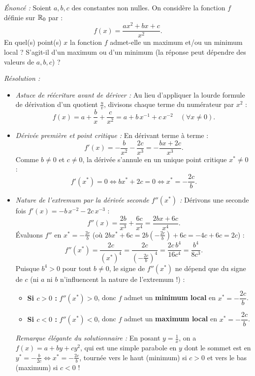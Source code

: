 \begin{exemple}
\emph{Énoncé :} Soient $a, b, c$ des constantes non nulles. On considère la fonction $f$ définie sur $\mathbb{R}_0$ par :
\[
    f(x) = \frac{ax^2 + bx + c}{x^2}.
\]
En quel(s) point(s) $x$ la fonction $f$ admet-elle un maximum et/ou un minimum local ? S'agit-il d'un maximum ou d'un minimum (la réponse peut dépendre des valeurs de $a, b, c$) ?

\emph{Résolution :}
\begin{itemize}
    \item \emph{Astuce de réécriture avant de dériver :} Au lieu d'appliquer la lourde formule de dérivation d'un quotient $\frac{u}{v}$, divisons chaque terme du numérateur par $x^2$ :
    \[
        f(x) = a + \frac{b}{x} + \frac{c}{x^2} = a + b\,x^{-1} + c\,x^{-2} \quad (\forall x \neq 0).
    \]
    \item \emph{Dérivée première et point critique :} En dérivant terme à terme :
    \[
        f'(x) = -\frac{b}{x^2} - \frac{2c}{x^3} = -\frac{bx + 2c}{x^3}.
    \]
    Comme $b \neq 0$ et $c \neq 0$, la dérivée s'annule en un unique point critique $x^* \neq 0$ :
    \[
        f'(x^*) = 0 \iff bx^* + 2c = 0 \iff \boxed{x^* = -\frac{2c}{b}}.
    \]
    \item \emph{Nature de l'extremum par la dérivée seconde $f''(x^*)$ :} Dérivons une seconde fois $f'(x) = -b\,x^{-2} - 2c\,x^{-3}$ :
    \[
        f''(x) = \frac{2b}{x^3} + \frac{6c}{x^4} = \frac{2bx + 6c}{x^4}.
    \]
    Évaluons $f''$ en $x^* = -\frac{2c}{b}$ (où $2bx^* + 6c = 2b\left(-\frac{2c}{b}\right) + 6c = -4c + 6c = 2c$) :
    \[
        f''(x^*) = \frac{2c}{(x^*)^4} = \frac{2c}{\left(-\frac{2c}{b}\right)^4} = \frac{2c\,b^4}{16c^4} = \frac{b^4}{8c^3}.
    \]
    Puisque $b^4 > 0$ pour tout $b \neq 0$, le signe de $f''(x^*)$ ne dépend que du signe de $c$ (ni $a$ ni $b$ n'influencent la nature de l'extremum !) :
    \begin{itemize}
        \item \textbf{Si $c > 0$ :} $f''(x^*) > 0$, donc $f$ admet un \textbf{minimum local} en $x^* = -\dfrac{2c}{b}$.
        \item \textbf{Si $c < 0$ :} $f''(x^*) < 0$, donc $f$ admet un \textbf{maximum local} en $x^* = -\dfrac{2c}{b}$.
    \end{itemize}
    \emph{Remarque élégante du solutionnaire :} En posant $y = \frac{1}{x}$, on a $f(x) = a + by + cy^2$, qui est une simple parabole en $y$ dont le sommet est en $y^* = -\frac{b}{2c} \iff x^* = -\frac{2c}{b}$, tournée vers le haut (minimum) si $c > 0$ et vers le bas (maximum) si $c < 0$ !
\end{itemize}
\end{exemple}

